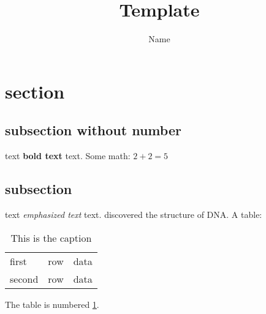 \documentclass[11pt]{article}
\title{Template}
\author{Name}
\begin{document}
\maketitle
\section{section}
\subsection*{subsection without number}
text \textbf{bold text} text. Some math: $2+2=5$
\subsection{subsection}
text \emph{emphasized text} text. \cite{WC:1953}
discovered the structure of DNA.
A table:
\begin{table}[!th]
\begin{tabular}{|l|c|r|}
\hline
first & row & data \\
second & row & data \\
\hline
\end{tabular}
\caption{This is the caption}
\label{ex:table}
\end{table}
The table is numbered \ref{ex:table}.
\end{document}
